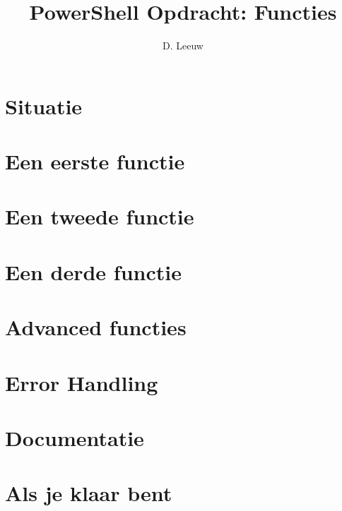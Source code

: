 \documentclass[a4paper,12pt,twoside,openright,titlepage]{article}
\author{D. Leeuw}
\title{PowerShell Opdracht: Functies}
\date{\today\\
0.0.0\\
\vfill
\raggedright
\copyright\ 2026 Dennis Leeuw\\
}
\begin{document}

\maketitle



\section{Situatie}


\section{Een eerste functie}


\section{Een tweede functie}


\section{Een derde functie}


\section{Advanced functies}


\section{Error Handling}


\section{Documentatie}


\section{Als je klaar bent}


\printindex
\end{document}
